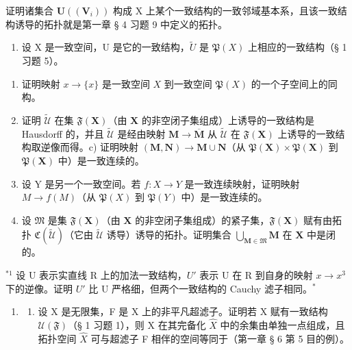 证明诸集合 \(\mathbf{U}((\mathbf{V}_{i}))\) 构成 X 上某个一致结构的一致邻域基本系，且该一致结构诱导的拓扑就是第一章 § 4 习题 9 中定义的拓扑。

\begin{enumerate}
\def\labelenumi{\arabic{enumi})}
\setcounter{enumi}{5}
\tightlist
\item
  设 X 是一致空间，U 是它的一致结构，\(\tilde{U}\) 是 \(\mathfrak{P}(X)\) 上相应的一致结构（§ 1 习题 5）。
\end{enumerate}

\begin{enumerate}
\def\labelenumi{\alph{enumi})}
\item
  证明映射 \(x \to \{x\}\) 是一致空间 \(X\) 到一致空间 \(\mathfrak{P}(X)\) 的一个子空间上的同构。
\item
  证明 \(\widetilde{\mathcal{U}}\) 在集 \(\mathfrak{F}(\mathbf{X})\)（由 \(\mathbf{X}\) 的非空闭子集组成）上诱导的一致结构是 Hausdorff 的，并且 \(\widetilde{\mathcal{U}}\) 是经由映射 \(\mathbf{M} \to \overline{\mathbf{M}}\) 从 \(\widetilde{\mathcal{U}}\) 在 \(\mathfrak{F}(\mathbf{X})\) 上诱导的一致结构取逆像而得。c) 证明映射 \((\mathbf{M}, \mathbf{N}) \to \mathbf{M} \cup \mathbf{N}\)（从 \(\mathfrak{P}(\mathbf{X}) \times \mathfrak{P}(\mathbf{X})\) 到 \(\mathfrak{P}(\mathbf{X})\) 中）是一致连续的。
\item
  设 Y 是另一个一致空间。若 \(f: X \to Y\) 是一致连续映射，证明映射 \(M \to f(M)\)（从 \(\mathfrak{P}(X)\) 到 \(\mathfrak{P}(Y)\) 中）是一致连续的。
\item
  设 \(\mathfrak{M}\) 是集 \(\mathfrak{F}(\mathbf{X})\)（由 \(\mathbf{X}\) 的非空闭子集组成）的紧子集，\(\mathfrak{F}(\mathbf{X})\) 赋有由拓扑 \(\mathfrak{C}(\tilde{\mathcal{U}})\)（它由 \(\tilde{\mathcal{U}}\) 诱导）诱导的拓扑。证明集合 \(\bigcup_{\mathbf{M} \in \mathfrak{M}} \mathbf{M}\) 在 \(\mathbf{X}\) 中是闭的。
\end{enumerate}

\BourbakiExerciseGroup

\(^{*1}\) 设 U 表示实直线 R 上的加法一致结构，\(U'\) 表示 U 在 R 到自身的映射 \(x \rightarrow x^{3}\) 下的逆像。证明 \(U'\) 比 U 严格细，但两个一致结构的 Cauchy 滤子相同。\(^{*}\)

\begin{enumerate}
\def\labelenumi{\arabic{enumi})}
\setcounter{enumi}{1}
\tightlist
\item
  \begin{enumerate}
  \def\labelenumii{\alph{enumii})}
  \tightlist
  \item
    设 X 是无限集，F 是 X 上的非平凡超滤子。证明若 X 赋有一致结构 \(\mathcal{U}(\mathfrak{F})\)（§ 1 习题 1），则 X 在其完备化 \(\hat{X}\) 中的余集由单独一点组成，且拓扑空间 \(\hat{X}\) 可与超滤子 F 相伴的空间等同于（第一章 § 6 第 5 目的例）。
  \end{enumerate}
\end{enumerate}

